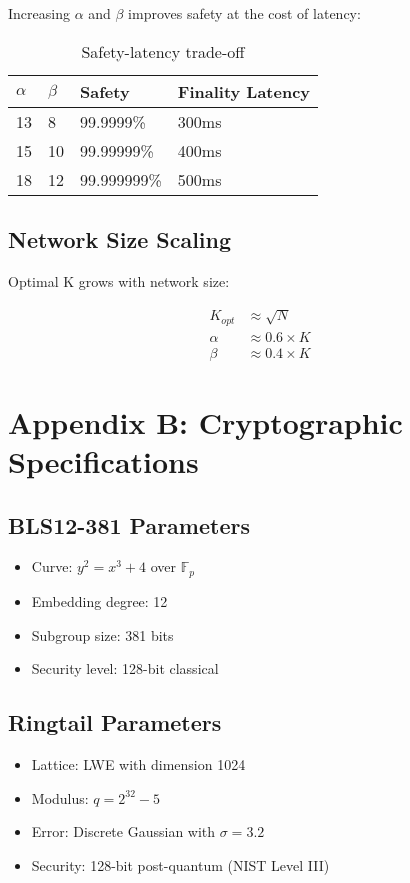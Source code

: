 \documentclass[11pt]{article}
\begin{document}
Increasing $\alpha$ and $\beta$ improves safety at the cost of latency:

\begin{table}[h]
\centering
\begin{tabular}{@{}llll@{}}
\toprule
$\alpha$ & $\beta$ & \textbf{Safety} & \textbf{Finality Latency} \\
\midrule
13 & 8 & 99.9999\% & 300ms \\
15 & 10 & 99.99999\% & 400ms \\
18 & 12 & 99.999999\% & 500ms \\
\bottomrule
\end{tabular}
\caption{Safety-latency trade-off}
\end{table}

\subsection{Network Size Scaling}

Optimal K grows with network size:

\begin{align}
K_{opt} &\approx \sqrt{N} \\
\alpha &\approx 0.6 \times K \\
\beta &\approx 0.4 \times K
\end{align}

\section{Appendix B: Cryptographic Specifications}

\subsection{BLS12-381 Parameters}
\begin{itemize}
\item Curve: $y^2 = x^3 + 4$ over $\mathbb{F}_p$
\item Embedding degree: 12
\item Subgroup size: 381 bits
\item Security level: 128-bit classical
\end{itemize}

\subsection{Ringtail Parameters}
\begin{itemize}
\item Lattice: LWE with dimension 1024
\item Modulus: $q = 2^{32} - 5$
\item Error: Discrete Gaussian with $\sigma = 3.2$
\item Security: 128-bit post-quantum (NIST Level III)
\end{itemize}
\end{document}
